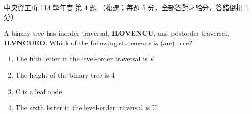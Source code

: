 \begin{pastexam}[label={px:ncu-114-dsa-04}]{中央資工所 114 學年度 第 4 題}
（複選；每題 5 分，全部答對才給分，答錯倒扣 1 分）

A binary tree has inorder traversal, \textbf{ILOVENCU}, and postorder traversal, \textbf{ILVNCUEO}.
Which of the following statements is (are) true?
\begin{enumerate}[label=(\alph*)]
\item The fifth letter in the level-order traversal is V
\item The height of the binary tree is 4
\item C is a leaf node
\item The sixth letter in the level-order traversal is U
\end{enumerate}
\end{pastexam}

